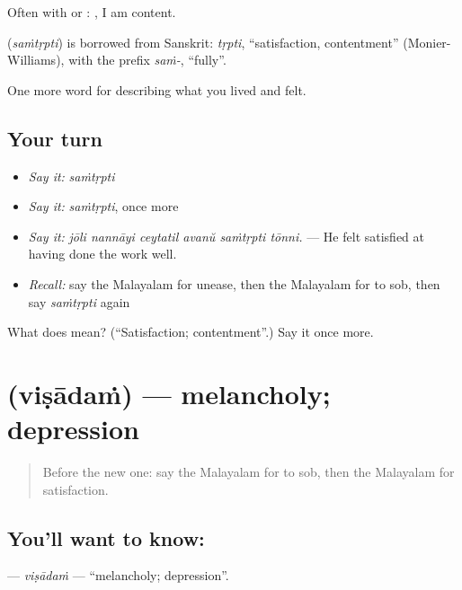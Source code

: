 Often with  or :   , I am content.

\begin{cousinweb}
\textbf{} (\emph{saṁtṛpti}) is borrowed from Sanskrit: \emph{tṛpti}, \textquotedblleft{}satisfaction, contentment\textquotedblright{} (Monier-Williams), with the prefix \emph{saṁ-}, \textquotedblleft{}fully\textquotedblright{}.
\end{cousinweb}

\begin{grammarlens}[title={What you've built}]
One more word for describing what you lived and felt.
\end{grammarlens}

\subsection*{Your turn}
\begin{itemize}
\raggedright
  \item \emph{Say it:} \emph{saṁtṛpti}
  \item \emph{Say it:} \emph{saṁtṛpti}, once more
  \item \emph{Say it:} \emph{jōli nannāyi ceytatil avanŭ saṁtṛpti tōnni.} — He felt satisfied at having done the work well.
  \item \emph{Recall:} say the Malayalam for unease, then the Malayalam for to sob, then say \emph{saṁtṛpti} again
\end{itemize}

\begin{tcolorbox}[breakable,colback=teal!4,colframe=teal!35!black,title={Before you move on}]
What does  mean? (\textquotedblleft{}Satisfaction; contentment\textquotedblright{}.) Say it once more.
\end{tcolorbox}
\section[\texorpdfstring{\ml{വിഷാദം} (viṣādaṁ)}{വിഷാദം (viṣādaṁ)}]{ (viṣādaṁ) — melancholy; depression}

\label{lesson:ML-C521-visadam}



\begin{quote}
Before the new one: say the Malayalam for to sob, then the Malayalam for satisfaction.
\end{quote}

\subsection*{You'll want to know: }
\textbf{} — \emph{viṣādaṁ} — \textquotedblleft{}melancholy; depression\textquotedblright{}.

